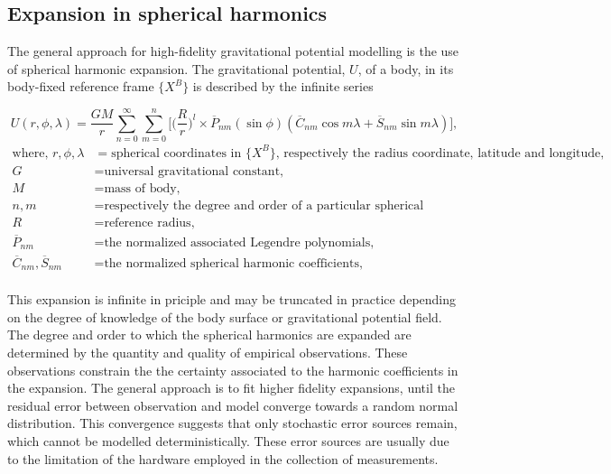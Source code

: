 \subsection{Expansion in spherical harmonics}\label{ssec:expansion_in_spherical_harmonics}

The general approach for high-fidelity gravitational potential modelling is the
use of spherical harmonic expansion. The gravitational potential, $U$, of a
body, in its body-fixed reference frame $\{X^B\}$ is described by the infinite
series

\begin{equation}
    U(r,\phi,\lambda) = \frac{GM}{r}\sum_{n=0}^\infty{}\sum_{m=0}^n{}\bigg[\bigg(\frac{R}{r}\bigg)^l\times{}\overline{P}_{nm}(\sin{\phi})(\overline{C}_{nm}\cos{m\lambda}+\overline{S}_{nm}\sin{m\lambda})\bigg],
    \label{eq:grav_sh}
\end{equation}
\begin{equation*}
    \begin{aligned}
        \textrm{where, }
        r, \phi, \lambda &= \textrm{spherical coordinates in $\{X^B\}$, respectively the radius coordinate, latitude and longitude,} \\
        G &= \textrm{universal gravitational constant,} \\
        M &= \textrm{mass of body,} \\
        n, m &= \textrm{respectively the degree and order of a particular spherical harmonic,} \\
        R &= \textrm{reference radius,} \\
        \overline{P}_{nm} &= \textrm{the normalized associated Legendre polynomials,} \\
        \overline{C}_{nm}, \overline{S}_{nm} &= \textrm{the normalized spherical harmonic coefficients,} \\
    \end{aligned}
\end{equation*}

This expansion is infinite in priciple and may be truncated in practice
depending on the degree of knowledge of the body surface or gravitational
potential field. The degree and order to which the spherical harmonics are
expanded are determined by the quantity and quality of empirical observations.
These observations constrain the the certainty associated to the harmonic
coefficients in the expansion. The general approach is to fit higher fidelity
expansions, until the residual error between observation and model converge
towards a random normal distribution. This convergence suggests that only
stochastic error sources remain, which cannot be modelled deterministically.
These error sources are usually due to the limitation of the hardware employed
in the collection of measurements.

